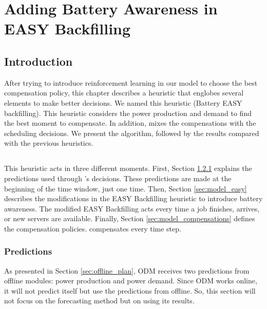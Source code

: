 \chapter{Adding Battery Awareness in EASY Backfilling}
\label{cha:heuristic}

\minitoc

\section{Introduction}

After trying to introduce reinforcement learning in our model to choose the best compensation policy, this chapter describes a heuristic that englobes several elements to make better decisions. We named this heuristic \emph{\systemName} (Battery EASY backfilling). This heuristic considers the power production and demand to find the best moment to compensate. In addition, \emph{\systemName} mixes the compensations with the scheduling decisions. We present the algorithm, followed by the results compared with the previous heuristics.

\section{\systemName}

This heuristic acts in three different moments. First, Section \ref{sec:model_predictions} explains the predictions used through \emph{\systemName}'s decisions. These predictions are made at the beginning of the time window, just one time. Then, Section \ref{sec:model_easy} describes the modifications in the EASY Backfilling heuristic to introduce battery awareness. The modified EASY Backfilling acts every time a job finishes, arrives, or new servers are available. Finally, Section \ref{sec:model_compensations} defines the compensation policies. \emph{\systemName} compensates every time step.

\subsection{Predictions}
\label{sec:model_predictions}

As presented in Section \ref{sec:offline_plan}, ODM receives two predictions from offline modules: power production and power demand. Since ODM works online, it will not predict itself but use the predictions from offline. So, this section will not focus on the forecasting method but on using its results.

